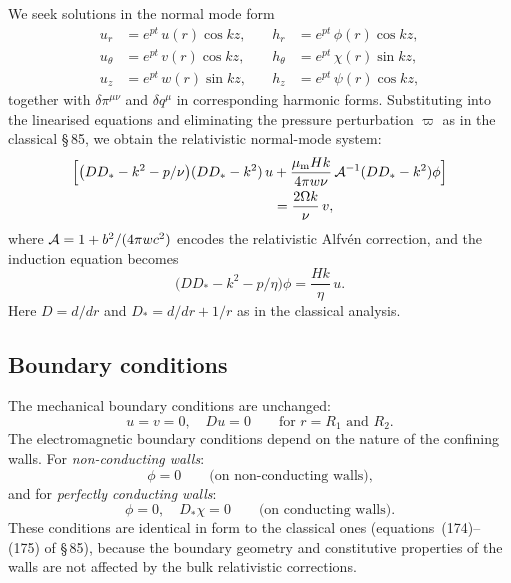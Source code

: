 We seek solutions in the normal mode form
\begin{equation}
\begin{aligned}
  u_r &= e^{pt}\,u(r)\cos kz, &\quad h_r &= e^{pt}\,\phi(r)\cos kz,\\
  u_\theta &= e^{pt}\,v(r)\cos kz, &\quad h_\theta &= e^{pt}\,\chi(r)\sin kz,\\
  u_z &= e^{pt}\,w(r)\sin kz, &\quad h_z &= e^{pt}\,\psi(r)\cos kz,
\end{aligned}
  \label{eq:rel-9-158R}
\end{equation}
together with $\delta\pi^{\mu\nu}$ and $\delta q^{\mu}$ in corresponding
harmonic forms.  Substituting into the linearised equations and
eliminating the pressure perturbation $\varpi$ as in the classical
\S\,85, we obtain the relativistic normal-mode system:
\begin{align}
  
  \Bigl[\bigl(DD_*-k^2-p/\nu\bigr)(DD_*-k^2)\,u
    &+ \frac{\mu_{\mathrm{m}}Hk}{4\pi\enthalpy\nu}\,
       \mathcal{A}^{-1}(DD_*-k^2)\phi\Bigr]
  \notag\\
  &= \frac{2\Omega k}{\nu}\,v,
  \label{eq:rel-9-168R}
\end{align}
where $\mathcal{A} = 1 + b^2/(4\pi w c^2)$ encodes the
relativistic Alfv\'en correction, and the induction equation becomes
\begin{equation}
  
  \bigl(DD_*-k^2-p/\eta\bigr)\phi = \frac{Hk}{\eta}\,u.
  \label{eq:rel-9-162R}
\end{equation}
Here $D = d/dr$ and $D_* = d/dr + 1/r$ as in the classical analysis.

\subsection{Boundary conditions}
\label{sec:rel-87-bc}

The mechanical boundary conditions are unchanged:
\begin{equation}
  u = v = 0,\quad Du = 0 \qquad\text{for } r = R_1 \text{ and } R_2.
  \label{eq:rel-9-169R}
\end{equation}
The electromagnetic boundary conditions depend on the nature of the
confining walls.  For \emph{non-conducting walls}:
\begin{equation}
  \phi = 0 \qquad\text{(on non-conducting walls),}
  \label{eq:rel-9-174R}
\end{equation}
and for \emph{perfectly conducting walls}:
\begin{equation}
  \phi = 0,\quad D_*\chi = 0 \qquad\text{(on conducting walls).}
  \label{eq:rel-9-175R}
\end{equation}
These conditions are identical in form to the classical ones
(equations~(174)--(175) of \S\,85), because the boundary geometry and
constitutive properties of the walls are not affected by the bulk
relativistic corrections.

